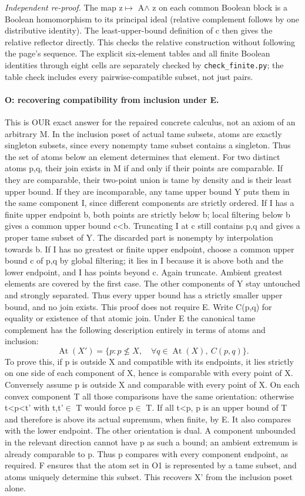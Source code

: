 \emph{Independent re-proof.} The map z$\mapsto$ A$\wedge$ z on each common Boolean block is a Boolean homomorphism to its principal ideal (relative complement follows by one distributive identity). The least-upper-bound definition of c then gives the relative reflector directly. This checks the relative construction without following the page's sequence. The explicit six-element tables and all finite Boolean identities through eight cells are separately checked by \texttt{check\_finite.py}; the table check includes every pairwise-compatible subset, not just pairs.

\paragraph{O: recovering compatibility from inclusion under E.}\label{lem:ordercompat}
This is OUR exact answer for the repaired concrete calculus, not an axiom of an arbitrary M. In the inclusion poset of actual tame subsets, atoms are exactly singleton subsets, since every nonempty tame subset contains a singleton. Thus the set of atoms below an element determines that element.
For two distinct atoms p,q, their join exists in M if and only if their points are comparable. If they are comparable, their two-point union is tame by density and is their least upper bound. If they are incomparable, any tame upper bound Y puts them in the same component I, since different components are strictly ordered. If I has a finite upper endpoint b, both points are strictly below b; local filtering below b gives a common upper bound c<b. Truncating I at c still contains p,q and gives a proper tame subset of Y. The discarded part is nonempty by interpolation towards b. If I has no greatest or finite upper endpoint, choose a common upper bound c of p,q by global filtering; it lies in I because it is above both and the lower endpoint, and I has points beyond c. Again truncate. Ambient greatest elements are covered by the first case. The other components of Y stay untouched and strongly separated. Thus every upper bound has a strictly smaller upper bound, and no join exists. This proof does not require E.
Write C(p,q) for equality or existence of that atomic join. Under E the canonical tame complement has the following description entirely in terms of atoms and inclusion:
\[
 \operatorname{At}(X')=\{p:p\not\leq X,\quad \forall q\in\operatorname{At}(X),\ C(p,q)\}.                 \tag{O1}
\]
To prove this, if p is outside X and compatible with its endpoints, it lies strictly on one side of each component of X, hence is comparable with every point of X. Conversely assume p is outside X and comparable with every point of X. On each convex component T all those comparisons have the same orientation: otherwise t<p<t' with t,t'$\in$ T would force p$\in$ T. If all t<p, p is an upper bound of T and therefore is above its actual supremum, when finite, by E. It also compares with the lower endpoint. The other orientation is dual. A component unbounded in the relevant direction cannot have p as such a bound; an ambient extremum is already comparable to p. Thus p compares with every component endpoint, as required. F ensures that the atom set in O1 is represented by a tame subset, and atoms uniquely determine this subset. This recovers X' from the inclusion poset alone.
